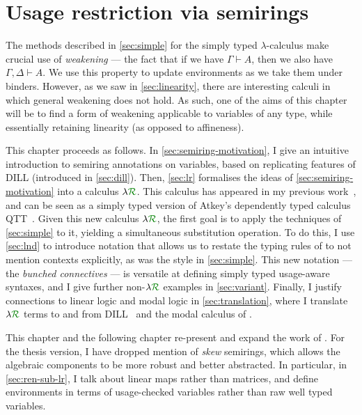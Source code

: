 \chapter{Usage restriction via semirings}\label{sec:semirings}

The methods described in \cref{sec:simple} for the simply typed
$\lambda$-calculus
make crucial use of \emph{weakening} --- the fact that if we have
$\Gamma \vdash A$, then we also have $\Gamma, \Delta \vdash A$.
We use this property to update environments as we take them under binders.
However, as we saw in \cref{sec:linearity}, there are interesting calculi in
which general weakening does not hold.
As such, one of the aims of this chapter will be to find a form of weakening
applicable to variables of any type, while essentially retaining linearity
(as opposed to affineness).

This chapter proceeds as follows.
In \cref{sec:semiring-motivation}, I give an intuitive introduction to semiring
annotations on variables, based on replicating features of DILL (introduced in
\cref{sec:dill}).
Then, \cref{sec:lr} formalises the ideas of \cref{sec:semiring-motivation} into
a calculus $\name$.
This calculus has
appeared in my previous work~\citep{WA21}, and can be seen as a
simply typed version of Atkey's dependently typed calculus QTT~\citep{Atkey18}.
Given this new calculus $\name$, the first goal is to apply the techniques of
\cref{sec:simple} to it, yielding a simultaneous substitution operation.
To do this, I use \cref{sec:lnd} to introduce notation that allows us to restate
the typing rules of \name{} to not mention contexts explicitly, as was the style
in \cref{sec:simple}.
This new notation --- the \emph{bunched connectives} --- is versatile at
defining simply typed usage-aware syntaxes, and I give further non-$\name$
examples in \cref{sec:variant}.
Finally, I justify connections to linear logic and modal logic in
\cref{sec:translation}, where I translate $\name$ terms to and from
DILL~\citep{Barber1996} and the modal calculus of \citet{judgmental}.

This chapter and the following chapter re-present and expand the work of
\citet{WA21}.
For the thesis version, I have dropped mention of \emph{skew} semirings, which
allows the algebraic components to be more robust and better abstracted.
In particular, in \cref{sec:ren-sub-lr}, I talk about linear maps rather than
matrices, and define environments in terms of usage-checked variables rather
than raw well typed variables.

